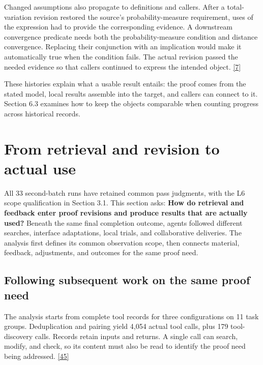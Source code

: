 Changed assumptions also propagate to definitions and callers. After a total-variation revision restored the source's probability-measure requirement, uses of the expression had to provide the corresponding evidence. A downstream convergence predicate needs both the probability-measure condition and distance convergence. Replacing their conjunction with an implication would make it automatically true when the condition fails. The actual revision passed the needed evidence so that callers continued to express the intended object. \hyperlink{ref-7}{\mbox{[7]}}

These histories explain what a usable result entails: the proof comes from the stated model, local results assemble into the target, and callers can connect to it. Section 6.3 examines how to keep the objects comparable when counting progress across historical records.

\section[From retrieval and revision to actual use]{\texorpdfstring{\protect\hypertarget{section-5}{}From retrieval and revision to actual use}{From retrieval and revision to actual use}}
All 33 second-batch runs have retained common pass judgments, with the L6 scope qualification in Section 3.1. This section asks: \textbf{How do retrieval and feedback enter proof revisions and produce results that are actually used?} Beneath the same final completion outcome, agents followed different searches, interface adaptations, local trials, and collaborative deliveries. The analysis first defines its common observation scope, then connects material, feedback, adjustments, and outcomes for the same proof need.

\subsection[Following subsequent work on the same proof need]{\texorpdfstring{\protect\hypertarget{section-5-1}{}Following subsequent work on the same proof need}{Following subsequent work on the same proof need}}
The analysis starts from complete tool records for three configurations on 11 task groups. Deduplication and pairing yield 4,054 actual tool calls, plus 179 tool-discovery calls. Records retain inputs and returns. A single call can search, modify, and check, so its content must also be read to identify the proof need being addressed. \hyperlink{ref-45}{\mbox{[45]}}

